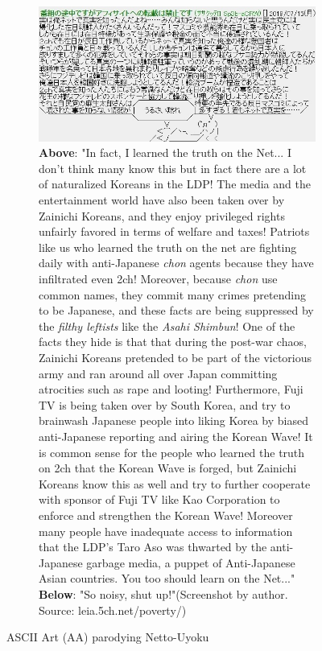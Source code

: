\documentclass[10pt,british,A4paper,,openany]{memoir}
\begin{document}
\begin{figure}[!htb]
 \centering
 \begin{subfigure}[b]{0.95\textwidth}
  \includegraphics[width=\textwidth]{images/2channel/anti-aa.jpg}
  \caption*{\textbf{Above}: "In fact, I learned the truth on the Net... I don't think many know this but in fact there are a lot of naturalized Koreans in the LDP! The media and the entertainment world have also been taken over by Zainichi Koreans, and they enjoy privileged rights unfairly favored in terms of welfare and taxes! Patriots like us who learned the truth on the net are fighting daily with anti-Japanese \textit{chon} agents because they have infiltrated even 2ch! Moreover, because \textit{chon} use common names, they commit many crimes pretending to be Japanese, and these facts are being suppressed by the \textit{filthy leftists} like the \textit{Asahi Shimbun}! One of the facts they hide is that that during the post-war chaos, Zainichi Koreans pretended to be part of the victorious army and ran around all over Japan committing atrocities such as rape and looting! Furthermore, Fuji TV is being taken over by South Korea, and try to brainwash Japanese people into liking Korea by biased anti-Japanese reporting and airing the Korean Wave! It is common sense for the people who learned the truth on 2ch that the Korean Wave is forged, but Zainichi Koreans know this as well and try to further cooperate with sponsor of Fuji TV like Kao Corporation to enforce and strengthen the Korean Wave! Moreover many people have inadequate access to information that the LDP's Taro Aso was thwarted by the anti-Japanese garbage media, a puppet of Anti-Japanese Asian countries. You too should learn on the Net..." \textbf{Below}: "So noisy, shut up!"\newline (Screenshot by author. Source: leia.5ch.net/poverty/)}
  \label{fig:aajp}
 \end{subfigure}
 \caption{ASCII Art (AA) parodying Netto-Uyoku}\label{fig:aa}
\end{figure}
\end{document}
